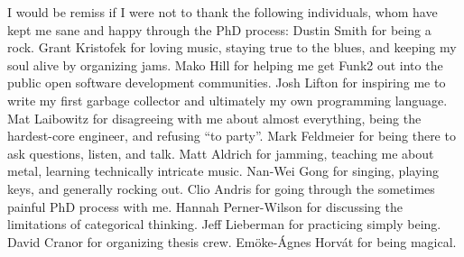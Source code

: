 \vspace{5mm}

\noindent I would be remiss if I were not to thank the following individuals,
whom have kept me sane and happy through the PhD process:
Dustin Smith for being a rock.
Grant Kristofek for loving music, staying true to the blues, and keeping my soul alive by organizing jams.
Mako Hill for helping me get Funk2 out into the public open software development communities.
Josh Lifton for inspiring me to write my first garbage collector and ultimately my own programming language.
Mat Laibowitz for disagreeing with me about almost everything, being the hardest-core engineer, and refusing ``to party''.
Mark Feldmeier for being there to ask questions, listen, and talk.
Matt Aldrich for jamming, teaching me about metal, learning technically intricate music.
Nan-Wei Gong for singing, playing keys, and generally rocking out.
Clio Andris for going through the sometimes painful PhD process with me.
Hannah Perner-Wilson for discussing the limitations of categorical thinking.
Jeff Lieberman for practicing simply being.
David Cranor for organizing thesis crew.
Em\"{o}ke-\'{A}gnes Horv\'{a}t for being magical.

\endgroup

